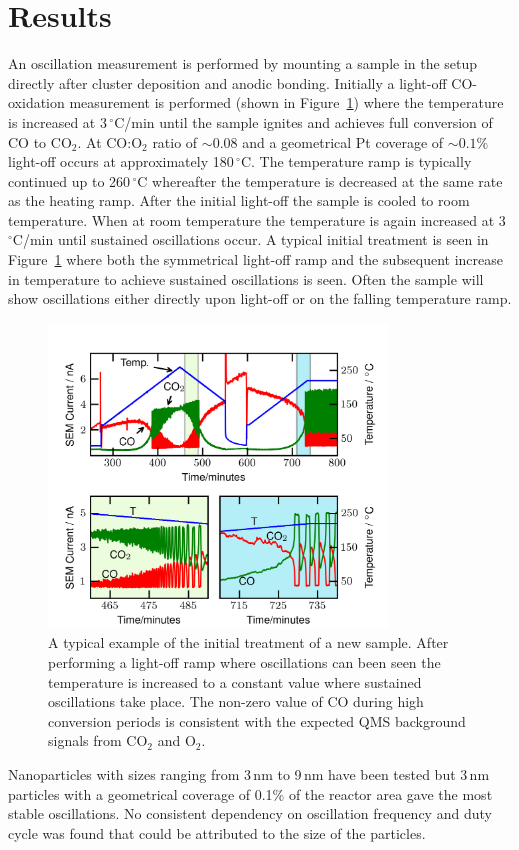 \documentclass[8.5pt,twoside,twocolumn]{article}
\begin{document}
\section{Results}
An oscillation measurement is performed by mounting a sample in the setup directly after cluster deposition and anodic bonding. Initially a light-off CO-oxidation measurement is performed (shown in Figure~\ref{fgr:initial_treatment}) where the temperature is increased at 3\,$^\circ$C/min until the sample ignites and achieves full conversion of CO to CO$_2$. At CO:O$_2$ ratio of $\sim0.08$ and a geometrical Pt coverage of $\sim0.1\%$ light-off occurs at approximately 180\,$^\circ$C. The temperature ramp is typically continued up to 260\,$^\circ$C whereafter the temperature is decreased at the same rate as the heating ramp. After the initial light-off the sample is cooled to room temperature. When at room temperature the temperature is again increased at 3\,$^\circ$C/min until sustained oscillations occur. A typical initial treatment is seen in Figure~\ref{fgr:initial_treatment} where both the symmetrical light-off ramp and the subsequent increase in temperature to achieve sustained oscillations is seen. Often the sample will show oscillations either directly upon light-off or on the falling temperature ramp.
\begin{figure}[h]
\centering
  \includegraphics[width=9cm]{initial_treatment.png}
  \caption{A typical example of the initial treatment of a new sample. After performing a light-off ramp where oscillations can been seen the temperature is increased to a constant value where sustained oscillations take place. The non-zero value of CO during high conversion periods is consistent with the expected QMS background signals from CO$_2$ and O$_2$.}
  \label{fgr:initial_treatment}
\end{figure}
Nanoparticles with sizes ranging from 3\,nm to 9\,nm have been tested but 3\,nm particles with a geometrical coverage of 0.1\% of the reactor area gave the most stable oscillations. No consistent dependency on oscillation frequency and duty cycle was found that could be attributed to the size of the particles.
\end{document}
